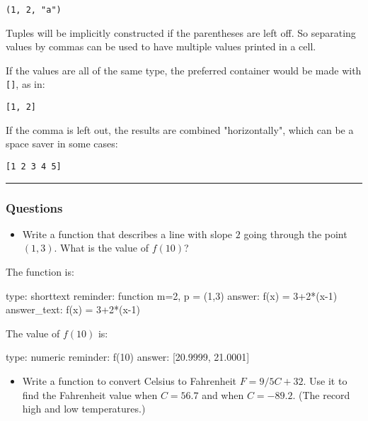 \documentclass[12pt]{article}
\begin{document}
\begin{verbatim}
(1, 2, "a")
\end{verbatim}
Tuples will be implicitly constructed if the parentheses are left off.
So separating values by commas can be used to have multiple values
printed in a cell.

If the values are all of the same type, the preferred container would be
made with \texttt{{[}{]}}, as in:



\begin{verbatim}
[1, 2]
\end{verbatim}
If the comma is left out, the results are combined "horizontally", which
can be a space saver in some cases:



\begin{verbatim}
[1 2 3 4 5]
\end{verbatim}
\begin{center}\rule{3in}{0.4pt}\end{center}

\subsubsection{Questions}

\begin{itemize}
\itemsep1pt\parskip0pt
\item
  Write a function that describes a line with slope $2$ going through
  the point $(1,3)$. What is the value of $f(10)$?
\end{itemize}

The function is:

\begin{answer}
type: shorttext
reminder: function m=2, p = (1,3)
answer: f(x) = 3+2*(x-1)
answer_text: f(x) = 3+2*(x-1) 
\end{answer}

The value of $f(10)$ is:

\begin{answer}
    type: numeric
    reminder: f(10)
    answer: [20.9999, 21.0001]

\end{answer}

\begin{itemize}
\itemsep1pt\parskip0pt
\item
  Write a function to convert Celsius to Fahrenheit $F=9/5 C +   32$.
  Use it to find the Fahrenheit value when $C=56.7$ and when $C=-89.2$.
  (The record high and low temperatures.)
\end{itemize}
\end{document}
